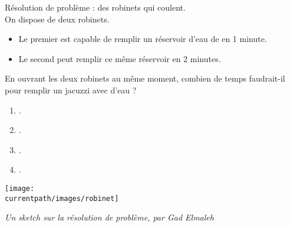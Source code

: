 \begin{exercice}
    Résolution de problème : des robinets qui coulent. \\
    On dispose de deux robinets.
    \begin{itemize}
       \item Le premier est capable de remplir un réservoir d’eau de  en 1 minute.
       \item Le second peut remplir ce même réservoir en 2 minutes.
    \end{itemize}
    En ouvrant les deux robinets au même moment, combien de temps faudrait-il pour remplir un jacuzzi avec  d’eau ? \\
    \begin{minipage}{4cm}
       \begin{enumerate}
          \item {}. 
          \item {}.
          \item {}.
          \item {}.
       \end{enumerate}
    \end{minipage}
    \begin{minipage}{3cm}
       \texttt{[image: \\currentpath/images/robinet]}
    \end{minipage}
    \begin{flushright}
        {\it Un sketch sur la résolution de problème, par Gad Elmaleh}
    \end{flushright}
 \end{exercice}
 
